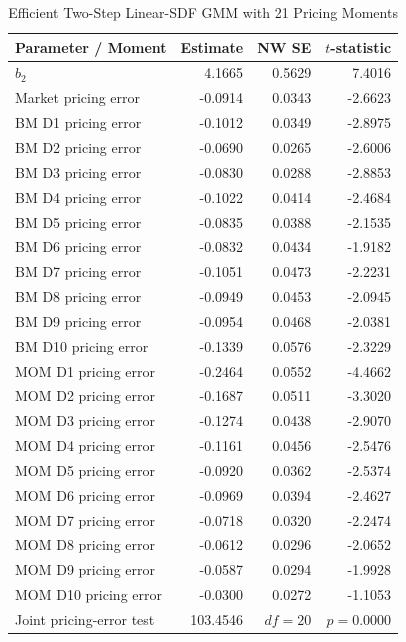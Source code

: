 \begin{table}[H]
  \centering
  \caption{Efficient Two-Step Linear-SDF GMM with 21 Pricing Moments}
  \label{tab:4c-gmm}
  \begin{minipage}{0.98\textwidth}
    \centering
    \scriptsize
    \begin{tabular*}{\linewidth}{@{\extracolsep{\fill}}lrrr@{}}
      \toprule
      Parameter / Moment & Estimate & NW SE & $t$-statistic \\
      \midrule
      $\hat{b}_2$ & 4.1665 & 0.5629 & 7.4016 \\
      Market pricing error & -0.0914 & 0.0343 & -2.6623 \\
      BM D1 pricing error & -0.1012 & 0.0349 & -2.8975 \\
      BM D2 pricing error & -0.0690 & 0.0265 & -2.6006 \\
      BM D3 pricing error & -0.0830 & 0.0288 & -2.8853 \\
      BM D4 pricing error & -0.1022 & 0.0414 & -2.4684 \\
      BM D5 pricing error & -0.0835 & 0.0388 & -2.1535 \\
      BM D6 pricing error & -0.0832 & 0.0434 & -1.9182 \\
      BM D7 pricing error & -0.1051 & 0.0473 & -2.2231 \\
      BM D8 pricing error & -0.0949 & 0.0453 & -2.0945 \\
      BM D9 pricing error & -0.0954 & 0.0468 & -2.0381 \\
      BM D10 pricing error & -0.1339 & 0.0576 & -2.3229 \\
      MOM D1 pricing error & -0.2464 & 0.0552 & -4.4662 \\
      MOM D2 pricing error & -0.1687 & 0.0511 & -3.3020 \\
      MOM D3 pricing error & -0.1274 & 0.0438 & -2.9070 \\
      MOM D4 pricing error & -0.1161 & 0.0456 & -2.5476 \\
      MOM D5 pricing error & -0.0920 & 0.0362 & -2.5374 \\
      MOM D6 pricing error & -0.0969 & 0.0394 & -2.4627 \\
      MOM D7 pricing error & -0.0718 & 0.0320 & -2.2474 \\
      MOM D8 pricing error & -0.0612 & 0.0296 & -2.0652 \\
      MOM D9 pricing error & -0.0587 & 0.0294 & -1.9928 \\
      MOM D10 pricing error & -0.0300 & 0.0272 & -1.1053 \\
      \midrule
      Joint pricing-error test & 103.4546 & $df=20$ & $p=0.0000$ \\
      \bottomrule
    \end{tabular*}


\end{minipage}
\end{table}
